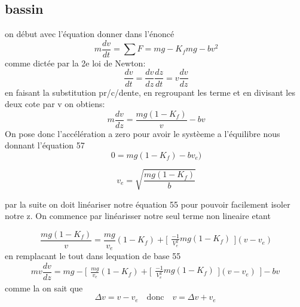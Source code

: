 \documentclass{article}
\begin{document}
\subsection{bassin}

on début avec l'équation donner dans l'énoncé
\begin{equation}
\ m \frac{dv}{dt} = \sum F = mg - K_{f}mg - bv^2
\end{equation}
comme dictée par la 2e loi de Newton:
\begin{equation}
\ \frac{dv}{dt} = \frac{dv}{dz} \frac{dz}{dt} = v\frac{dv}{dz}
\end{equation}
en faisant la substitution pr/c/dente, en regroupant les terme et en divisant les deux cote par v on obtiens:
\begin{equation}
\ m\frac{dv}{dz} =  \frac{mg ( 1- K_{f})}{v} - bv
\end{equation}
On pose donc l'accélération a zero pour avoir le systèeme a l'équilibre nous donnant l'équation 57
\begin{equation}
\ 0 =  mg ( 1- K_{f}) - bv_{e})
\end{equation}

\begin{equation}
\ v_{e} = \sqrt{\frac{mg(1-K_{f})}{b}}
\end{equation}

par la suite on doit linéariser notre équation 55 pour pouvoir facilement isoler notre z. On commence par linéarisser notre seul terme non lineaire etant 

\begin{equation}
\ \frac{mg ( 1- K_{f})}{v} = \frac{mg}{v_{e}}(1-K_{f})+
\Bigg[\begin{array}{cc}
    \frac{-1}{V_{e}^2}mg(1-K_{f})
    \end{array}\Bigg]
    (v-v_{e})
\end{equation}
en remplacant le tout dans lequation de base 55
\begin{equation}
mv \frac{dv}{dz} = mg - \Bigg[\begin{array}{cc}
\frac{mg}{v_{e}}(1-K_{f})+
\Bigg[\begin{array}{cc}
    \frac{-1}{V_{e}^2}mg(1-K_{f})
    \end{array}\Bigg]
    (v-v_{e}) \end{array}\Bigg] - bv
\end{equation}
comme la on sait que
\begin{equation}
\Delta v = v - v_{e}  \quad  \textrm{donc} \quad    v = \Delta v+ v_{e}
\end{equation}
\end{document}
